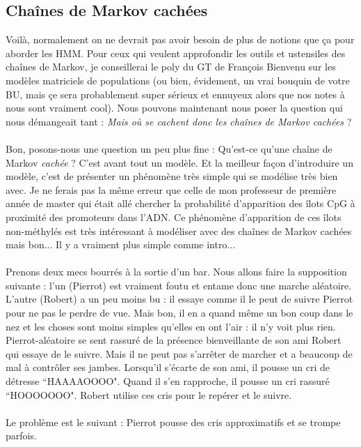 \documentclass[english]{article}
\begin{document}
\subsection{Cha\^ines de Markov cachées}

Voilà, normalement on ne devrait pas avoir besoin de plus de notions que ça pour aborder les HMM. Pour ceux qui veulent approfondir les outils et ustensiles des cha\^ines de Markov, je conseillerai le poly du GT de François Bienvenu sur les modèles matriciels de populations \cite{5} (ou bien, évidement, un vrai bouquin de votre BU, mais çe sera probablement super sérieux et ennuyeux alors que nos notes à nous sont vraiment cool). Nous pouvons maintenant nous poser la question qui nous démangeait tant : \textit{Mais où se cachent donc les chaînes de Markov cachées} ?\\
\\
Bon, posons-nous une question un peu plus fine : Qu'est-ce qu'une chaîne de Markov \textit{cachée} ? C'est avant tout un modèle. Et la meilleur façon d'introduire un modèle, c'est de présenter un phénomène très simple qui se modélise très bien avec. Je ne ferais pas la même erreur que celle de mon professeur de première année de master qui était allé chercher la probabilité d'apparition des îlots CpG à proximité des promoteurs dans l'ADN. Ce phénomène d'apparition de ces îlots non-méthylés est très intéressant à modéliser avec des chaînes de Markov cachées mais bon... Il y a vraiment plus simple comme intro...\\
\\
Prenons deux mecs bourrés à la sortie d'un bar. Nous allons faire la supposition suivante : l'un (Pierrot) est vraiment foutu et entame donc une marche aléatoire. L'autre (Robert) a un peu moins bu : il essaye comme il le peut de suivre Pierrot pour ne pas le perdre de vue. Mais bon, il en a quand même un bon coup dans le nez et les choses sont moins simples qu'elles en ont l'air : il n'y voit plus rien. Pierrot-aléatoire se sent rassuré de la présence bienveillante de son ami Robert qui essaye de le suivre. Mais il ne peut pas s'arrêter de marcher et a beaucoup de mal à contrôler ses jambes. Lorsqu'il s'écarte de son ami, il pousse un cri de détresse ``HAAAAOOOO". Quand il s'en rapproche, il pousse un cri rassuré ``HOOOOOOO". Robert utilise ces cris pour le repérer et le suivre. \\
\\
Le problème est le suivant : Pierrot pousse des cris approximatifs et se trompe parfois. \\
\end{document}
